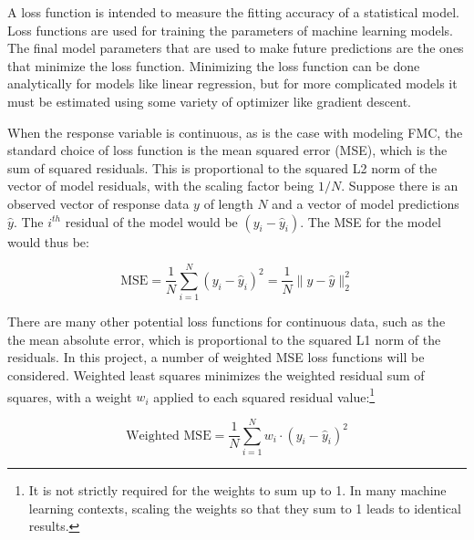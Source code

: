 \documentclass[11pt]{article}%
\begin{document}
A loss function is intended to measure the fitting accuracy of a statistical model. Loss functions are used for training the parameters of machine learning models. The final model parameters that are used to make future predictions are the ones that minimize the loss function. Minimizing the loss function can be done analytically for models like linear regression, but for more complicated models it must be estimated using some variety of optimizer like gradient descent. 

When the response variable is continuous, as is the case with modeling FMC, the standard choice of loss function is the mean squared error (MSE), which is the sum of squared residuals. This is proportional to the squared L2 norm of the vector of model residuals, with the scaling factor being $1/N$. Suppose there is an observed vector of response data $y$ of length $N$ and a vector of model predictions $\hat y$. The $i^{th}$ residual of the model would be $(y_i - \hat y_i)$. The MSE for the model would thus be:


\begin{equation}
    \label{eq:mse}
    \text{MSE} = \frac{1}{N}\sum_{i=1}^N (y_i - \hat y_i)^2 = \frac{1}{N}\|y - \hat y\|^2_2
\end{equation}

There are many other potential loss functions for continuous data, such as the the mean absolute error, which is proportional to the squared L1 norm of the residuals. In this project, a number of weighted MSE loss functions will be considered. Weighted least squares minimizes the weighted residual sum of squares, with a weight $w_i$ applied to each squared residual value:\footnote{It is not strictly required for the weights to sum up to 1. In many machine learning contexts, scaling the weights so that they sum to 1 leads to identical results.}


\begin{equation}
    \label{eq:wmse}
    \text{Weighted MSE} = \frac{1}{N}\sum_{i=1}^N w_i\cdot (y_i - \hat y_i)^2
\end{equation}
\end{document}
